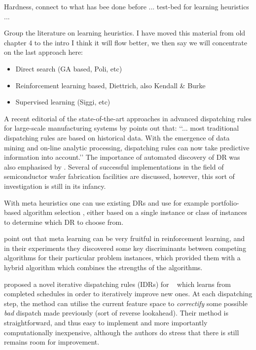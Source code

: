 \documentclass[smallextended]{svjour3}
\begin{document}
Hardness, connect to what has bee done before ... test-bed for learning heuristics ...

Group the literature on learning heuristics. I have moved this material from old chapter 4 to the intro I think it will flow better, we then say we will concentrate on the last approach here:
\begin{itemize}
\item Direct search (GA based, Poli, etc)
\item Reinforcement learning based, Diettrich, also Kendall \& Burke
\item Supervised learning (Siggi, etc)
\end{itemize}


A recent editorial of the state-of-the-art approaches in advanced dispatching 
rules for large-scale manufacturing systems by \citet{Chen13} points out that:
\lq\lq ... most traditional dispatching rules are based on historical data. 
With the emergence of data mining and on-line analytic processing, dispatching 
rules can now take predictive information into account.\rq\rq 
The importance of automated discovery of DR was also emphasised by 
\cite{Monch13}. 
Several of successful implementations in the field of semiconductor wafer 
fabrication facilities are discussed, however, this sort of investigation is 
still in its infancy.


With meta heuristics one can use existing DRs and use for example 
portfolio-based algorithm selection \citep{Rice76,Gomes01}, either based on a 
single instance or class of instances \citep{Xu07} to determine which DR to 
choose from. 

\citet{Kalyanakrishnan11} point out that meta learning can be very fruitful in 
reinforcement learning, and in their experiments they discovered some key 
discriminants between competing algorithms for their particular problem 
instances, which provided them with a hybrid algorithm which combines the 
strengths of the algorithms.

\citet{Nguyen13} proposed a novel iterative dispatching rules (IDRs) for \JSP~
which learns from completed schedules in order to iteratively improve new ones. 
At each dispatching step, the method can utilise the current feature space to 
\emph{correctify} some possible \emph{bad} dispatch made previously (sort of 
reverse lookahead).  Their method is straightforward, and thus easy to 
implement and more importantly computationally inexpensive, although the 
authors do stress that there is still remains room for improvement.
\end{document}
